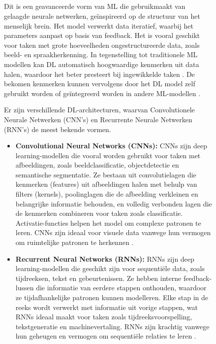 \begin{figure}[h]
\subsection{}%
\label{subsec:deep-learning}

Dit is een geavanceerde vorm van ML die gebruikmaakt van gelaagde neurale netwerken, geïnspireerd op de structuur van het menselijk brein.
Het model verwerkt data iteratief, waarbij het parameters aanpast op basis van feedback.  
Het is vooral geschikt voor taken met grote hoeveelheden ongestructureerde data, zoals beeld- en spraakherkenning. 
In tegenstelling tot traditionele ML modellen kan DL automatisch hoogwaardige kenmerken uit data halen, waardoor het beter presteert bij ingewikkelde taken \autocite{SharifaniEtAl2023}.
De bekomen kenmerken kunnen vervolgens door het DL model zelf gebruikt worden of geïntegreerd worden in andere ML-modellen \autocite{JanieschEtAl2021}. 

Er zijn verschillende DL-architecturen, waarvan Convolutionele Neurale Netwerken (CNN's) en Recurrente Neurale Netwerken (RNN's) de meest bekende vormen.

\begin{itemize}
    \item \textbf{Convolutional Neural Networks (CNNs):} 
    CNNs zijn deep learning-modellen die vooral worden gebruikt voor taken met afbeeldingen, zoals beeldclassificatie, objectdetectie en semantische segmentatie. Ze bestaan uit convolutielagen die kenmerken (features) uit afbeeldingen halen met behulp van filters (kernels), poolinglagen die de afbeelding verkleinen en belangrijke informatie behouden, en volledig verbonden lagen die de kenmerken combineren voor taken zoals classificatie. Activatie-functies helpen het model om complexe patronen te leren. CNNs zijn ideaal voor visuele data vanwege hun vermogen om ruimtelijke patronen te herkennen \autocite{ZhaoEtAl2024}.

    \item \textbf{Recurrent Neural Networks (RNNs):} 
    RNNs zijn deep learning-modellen die geschikt zijn voor sequentiële data, zoals tijdreeksen, tekst en gebeurtenissen. Ze hebben interne feedback-lussen die informatie van eerdere stappen onthouden, waardoor ze tijdafhankelijke patronen kunnen modelleren. Elke stap in de reeks wordt verwerkt met informatie uit vorige stappen, wat RNNs ideaal maakt voor taken zoals tijdreeksvoorspelling, tekstgeneratie en machinevertaling. RNNs zijn krachtig vanwege hun geheugen en vermogen om sequentiële relaties te leren \autocite{JanieschEtAl2021}.
\end{itemize}


\end{figure}
